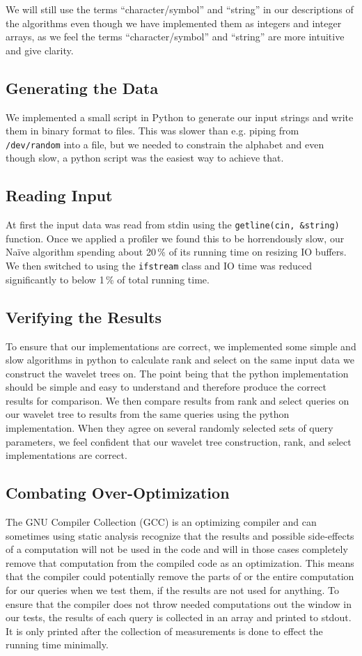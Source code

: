 We will still use the terms “character/symbol” and “string” in our descriptions of the algorithms even though we have implemented them as integers and integer arrays, as we feel the terms “character/symbol” and “string” are more intuitive and give clarity.


\subsection{Generating the Data}
We implemented a small script in Python to generate our input strings and write them in binary format to files.
This was slower than e.g. piping from \texttt{/dev/random} into a file, but we needed to constrain the alphabet and even though slow, a python script was the easiest way to achieve that.

\subsection{Reading Input}
At first the input data was read from stdin using the \texttt{getline(cin, \&string)} function. 
Once we applied a profiler we found this to be horrendously slow, our Naïve algorithm spending about 20\,\% of its running time on resizing IO buffers. 
We then switched to using the \texttt{ifstream} class and IO time was reduced significantly to below 1\,\% of total running time.

\subsection{Verifying the Results}
To ensure that our implementations are correct, we implemented some simple and slow algorithms in python to calculate rank and select on the same input data we construct the wavelet trees on.
The point being that the python implementation should be simple and easy to understand and therefore produce the correct results for comparison.
We then compare results from rank and select queries on our wavelet tree to results from the same queries using the python implementation.
When they agree on several randomly selected sets of query parameters, we feel confident that our wavelet tree construction, rank, and select implementations are correct.

\subsection{Combating Over-Optimization}
The GNU Compiler Collection (GCC) is an optimizing compiler and can sometimes using static analysis recognize that the results and possible side-effects of a computation will not be used in the code and will in those cases completely remove that computation from the compiled code as an optimization.
This means that the compiler could potentially remove the parts of or the entire computation for our queries when we test them, if the results are not used for anything.
To ensure that the compiler does not throw needed computations out the window in our tests, the results of each query is collected in an array and printed to stdout. It is only printed after the collection of measurements is done to effect the running time minimally.

